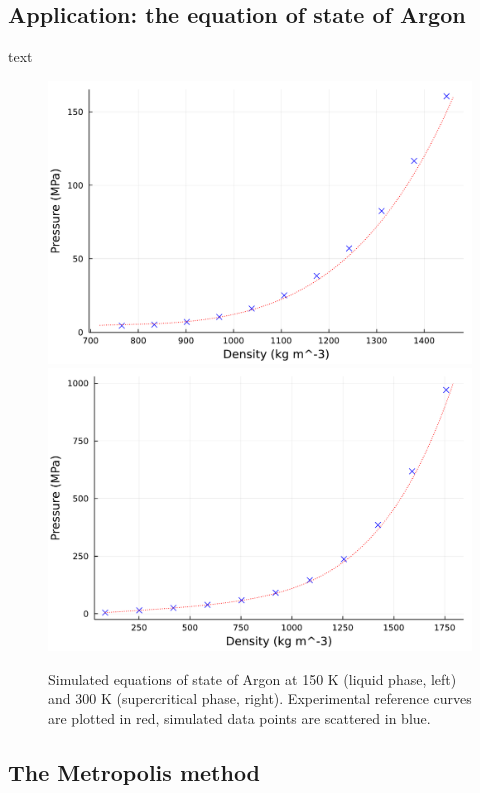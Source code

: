 \subsection{Application: the equation of state of Argon}
text
\begin{figure}[htbp]
    \begin{center}
      \includegraphics[width=0.49\linewidth]{figures/chapter1/argon_nvt_150K.pdf}
      \includegraphics[width=0.49\linewidth]{figures/chapter1/argon_nvt_300K.pdf}
      \caption{ \label{fig:eos_argon}
        Simulated equations of state of Argon at 150 K (liquid phase, left) and 300 K (supercritical phase, right). Experimental reference curves are plotted in red, simulated data points are scattered in blue.
      }
    \end{center}
  \end{figure}
\subsection{The Metropolis method}